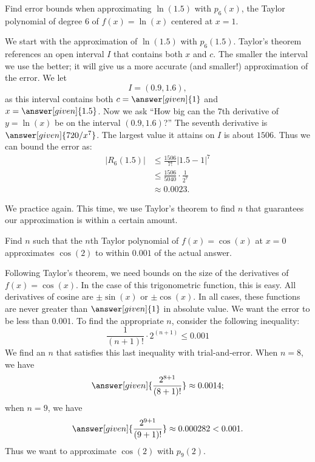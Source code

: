 \documentclass{ximera}
\begin{document}
\begin{example}
Find error bounds when approximating $\ln(1.5)$ with $p_6(x)$, the
Taylor polynomial of degree $6$ of $f(x)=\ln(x)$ centered at $x=1$.
\begin{explanation}
We start with the approximation of $\ln(1.5)$ with $p_6(1.5)$. Taylor's
theorem references an open interval $I$ that contains both $x$ and
$c$. The smaller the interval we use the better; it will give us a
more accurate (and smaller!) approximation of the error. We let
\[
I =(0.9,1.6),
\]
as this interval contains both $c=\answer[given]{1}$ and
$x=\answer[given]{1.5}$.  Now we ask ``How big can the $7$th
derivative of $y=\ln(x)$ be on the interval $(0.9,1.6)$?'' The seventh
derivative is $\answer[given]{720/x^7}$. The largest value it attains on $I$ is about
$1506$. Thus we can bound the error as:
\begin{align*}
|R_6(1.5)| &\leq \frac{1506}{7!}|1.5-1|^7\\
&\leq \frac{1506}{5040}\cdot\frac1{2^7}\\
&\approx 0.0023.
\end{align*}
\end{explanation}
\end{example}

  
We practice again. This time, we use Taylor's theorem to find $n$ that
guarantees our approximation is within a certain amount.

\begin{example}
  Find $n$ such that the $n$th Taylor polynomial of $f(x)=\cos(x)$ at
  $x=0$ approximates $\cos(2)$ to within $0.001$ of the actual
  answer.
\begin{explanation}
  Following Taylor's theorem, we need bounds on the size of the
  derivatives of $f(x)=\cos(x)$. In the case of this trigonometric
  function, this is easy. All derivatives of cosine are $\pm \sin(x)$
  or $\pm \cos(x)$. In all cases, these functions are never greater
  than $\answer[given]{1}$ in absolute value. We want the error to be
  less than $0.001$. To find the appropriate $n$, consider the
  following inequality:
  \[
  \frac{1}{(n+1)!}\cdot2^{(n+1)} \leq 0.001
  \]
We find an $n$ that satisfies this last inequality with trial-and-error. When $n=8$, we have
\[
\answer[given]{\frac{2^{8+1}}{(8+1)!}} \approx 0.0014;
\]
when $n=9$, we have
\[
\answer[given]{\frac{2^{9+1}}{(9+1)!}} \approx 0.000282 <0.001.
\]
Thus we want to approximate $\cos(2)$ with $p_9(2)$.
\end{explanation}
\end{example}
\end{document}
